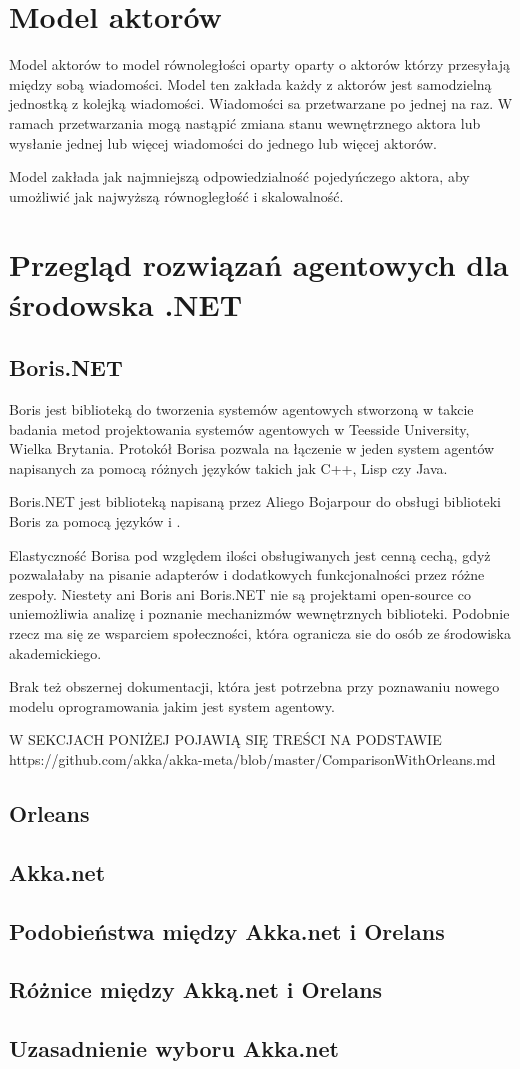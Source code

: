 \section{Model aktorów}
Model aktorów to model równoległości oparty oparty o aktorów którzy przesyłają między sobą wiadomości.
Model ten zakłada każdy z aktorów jest samodzielną jednostką z kolejką wiadomości. Wiadomości sa przetwarzane po jednej na raz. W ramach przetwarzania mogą nastąpić zmiana stanu wewnętrznego aktora lub wysłanie jednej lub więcej wiadomości do jednego lub więcej aktorów. 

Model zakłada jak najmniejszą odpowiedzialność pojedyńczego aktora, aby umożliwić jak najwyższą równogległość i skalowalność.

\section{Przegląd rozwiązań agentowych dla środowska .NET}
\subsection{Boris.NET}
Boris jest biblioteką do tworzenia systemów agentowych stworzoną w takcie badania metod projektowania systemów agentowych w Teesside University, Wielka Brytania. Protokół Borisa pozwala na łączenie w jeden system agentów napisanych za pomocą różnych języków takich jak C++, Lisp czy Java. 

Boris.NET jest biblioteką napisaną przez Aliego Bojarpour do obsługi biblioteki Boris za pomocą języków \csh i \fsh. 

Elastyczność Borisa pod względem ilości obsługiwanych jest cenną cechą, gdyż pozwalałaby na pisanie adapterów i dodatkowych funkcjonalności przez różne zespoły. 
Niestety ani Boris ani Boris.NET nie są projektami open-source co uniemożliwia analizę i poznanie mechanizmów wewnętrznych biblioteki. Podobnie rzecz ma się ze wsparciem społeczności, która ogranicza sie do osób ze środowiska akademickiego.

Brak też obszernej dokumentacji, która jest potrzebna przy poznawaniu nowego modelu oprogramowania jakim jest system agentowy.

W SEKCJACH PONIŻEJ POJAWIĄ SIĘ TREŚCI NA PODSTAWIE
https://github.com/akka/akka-meta/blob/master/ComparisonWithOrleans.md
\subsection{Orleans}


\subsection{Akka.net}


\subsection{Podobieństwa między Akka.net i Orelans}


\subsection{Różnice między Akką.net i Orelans}


\subsection{Uzasadnienie wyboru Akka.net}



